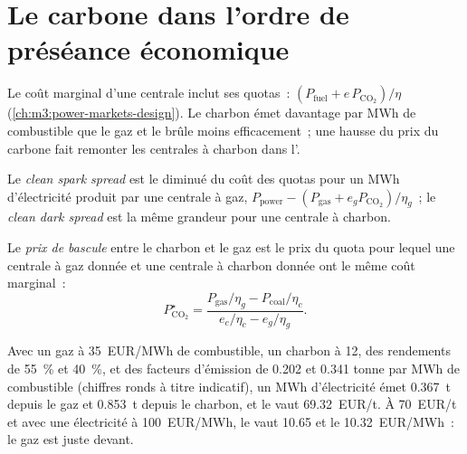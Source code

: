 \section{Le carbone dans l'ordre de préséance économique}

Le coût marginal d'une centrale inclut ses quotas~: $(P_{\mathrm{fuel}} + e\,P_{\mathrm{CO_2}})/\eta$
(\cref{ch:m3:power-markets-design}). Le charbon émet davantage par MWh de combustible que le gaz et
le brûle moins efficacement~; une hausse du prix du carbone fait remonter les centrales à charbon dans l'.

\begin{definition}\label{def:m3:emissions-and-environmental-markets:clean}
Le \emph{clean spark spread} est le  diminué du coût des
quotas pour un MWh d'électricité produit par une centrale à gaz, $P_{\mathrm{power}} - (P_{\mathrm{gas}} +
e_g P_{\mathrm{CO_2}})/\eta_g$~; le \emph{clean dark spread} est la même
grandeur pour une centrale à charbon.
\end{definition}

\begin{definition}\label{def:m3:emissions-and-environmental-markets:switch}
Le \emph{prix de bascule} entre le charbon et le gaz est le prix du quota pour lequel
une centrale à gaz donnée et une centrale à charbon donnée ont le même coût marginal~:
\[
P^{\star}_{\mathrm{CO_2}} = \frac{P_{\mathrm{gas}}/\eta_g - P_{\mathrm{coal}}/\eta_c}{e_c/\eta_c - e_g/\eta_g}.
\]
\end{definition}

\begin{example}\label{ex:m3:emissions-and-environmental-markets:switch}
Avec un gaz à \qty{35}{EUR/MWh} de combustible, un charbon à \qty{12}{}, des rendements de 55~\% et 40~\%, et
des facteurs d'émission de 0.202 et 0.341 tonne par MWh de combustible (chiffres ronds à titre indicatif), un MWh
d'électricité émet 0.367~t depuis le gaz et 0.853~t depuis le charbon, et le  vaut
\qty{69.32}{EUR/t}. À \qty{70}{EUR/t} et avec une électricité à \qty{100}{EUR/MWh}, le  vaut
\qty{10.65}{} et le  \qty{10.32}{EUR/MWh}~: le gaz est juste devant.
\end{example}

